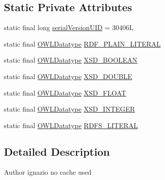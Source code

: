 \subsection*{Static Private Attributes}
\begin{DoxyCompactItemize}
\item 
static final long \hyperlink{classuk_1_1ac_1_1manchester_1_1cs_1_1owl_1_1owlapi_1_1_internals_no_cache_af57e31b0866b49416b438da42fb2ed1c}{serial\-Version\-U\-I\-D} = 30406\-L
\item 
static final \hyperlink{interfaceorg_1_1semanticweb_1_1owlapi_1_1model_1_1_o_w_l_datatype}{O\-W\-L\-Datatype} \hyperlink{classuk_1_1ac_1_1manchester_1_1cs_1_1owl_1_1owlapi_1_1_internals_no_cache_a47f6799baeb346adfb250b4031fec7e1}{R\-D\-F\-\_\-\-P\-L\-A\-I\-N\-\_\-\-L\-I\-T\-E\-R\-A\-L}
\item 
static final \hyperlink{interfaceorg_1_1semanticweb_1_1owlapi_1_1model_1_1_o_w_l_datatype}{O\-W\-L\-Datatype} \hyperlink{classuk_1_1ac_1_1manchester_1_1cs_1_1owl_1_1owlapi_1_1_internals_no_cache_ac2fda6f87d7991f50048769f853be805}{X\-S\-D\-\_\-\-B\-O\-O\-L\-E\-A\-N}
\item 
static final \hyperlink{interfaceorg_1_1semanticweb_1_1owlapi_1_1model_1_1_o_w_l_datatype}{O\-W\-L\-Datatype} \hyperlink{classuk_1_1ac_1_1manchester_1_1cs_1_1owl_1_1owlapi_1_1_internals_no_cache_a64dc0abf5125754767c833d0b73a9df4}{X\-S\-D\-\_\-\-D\-O\-U\-B\-L\-E}
\item 
static final \hyperlink{interfaceorg_1_1semanticweb_1_1owlapi_1_1model_1_1_o_w_l_datatype}{O\-W\-L\-Datatype} \hyperlink{classuk_1_1ac_1_1manchester_1_1cs_1_1owl_1_1owlapi_1_1_internals_no_cache_ac40f4b025bf7c58a2837e7d173fbe5fd}{X\-S\-D\-\_\-\-F\-L\-O\-A\-T}
\item 
static final \hyperlink{interfaceorg_1_1semanticweb_1_1owlapi_1_1model_1_1_o_w_l_datatype}{O\-W\-L\-Datatype} \hyperlink{classuk_1_1ac_1_1manchester_1_1cs_1_1owl_1_1owlapi_1_1_internals_no_cache_a5109b60810d72a1a3f0802e2477e6999}{X\-S\-D\-\_\-\-I\-N\-T\-E\-G\-E\-R}
\item 
static final \hyperlink{interfaceorg_1_1semanticweb_1_1owlapi_1_1model_1_1_o_w_l_datatype}{O\-W\-L\-Datatype} \hyperlink{classuk_1_1ac_1_1manchester_1_1cs_1_1owl_1_1owlapi_1_1_internals_no_cache_a63c02c6ea7692e14414703ee7d120ad3}{R\-D\-F\-S\-\_\-\-L\-I\-T\-E\-R\-A\-L}
\end{DoxyCompactItemize}


\subsection{Detailed Description}
\begin{DoxyAuthor}{Author}
ignazio no cache used 
\end{DoxyAuthor}


